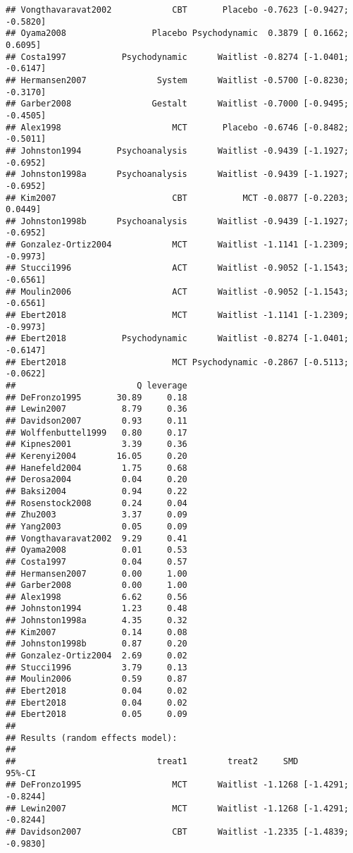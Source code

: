 \documentclass[]{book}
\theoremstyle{definition}
\theoremstyle{definition}
\theoremstyle{definition}
\theoremstyle{remark}
\begin{document}
\begin{verbatim}
## Vongthavaravat2002            CBT       Placebo -0.7623 [-0.9427; -0.5820]
## Oyama2008                 Placebo Psychodynamic  0.3879 [ 0.1662;  0.6095]
## Costa1997           Psychodynamic      Waitlist -0.8274 [-1.0401; -0.6147]
## Hermansen2007              System      Waitlist -0.5700 [-0.8230; -0.3170]
## Garber2008                Gestalt      Waitlist -0.7000 [-0.9495; -0.4505]
## Alex1998                      MCT       Placebo -0.6746 [-0.8482; -0.5011]
## Johnston1994       Psychoanalysis      Waitlist -0.9439 [-1.1927; -0.6952]
## Johnston1998a      Psychoanalysis      Waitlist -0.9439 [-1.1927; -0.6952]
## Kim2007                       CBT           MCT -0.0877 [-0.2203;  0.0449]
## Johnston1998b      Psychoanalysis      Waitlist -0.9439 [-1.1927; -0.6952]
## Gonzalez-Ortiz2004            MCT      Waitlist -1.1141 [-1.2309; -0.9973]
## Stucci1996                    ACT      Waitlist -0.9052 [-1.1543; -0.6561]
## Moulin2006                    ACT      Waitlist -0.9052 [-1.1543; -0.6561]
## Ebert2018                     MCT      Waitlist -1.1141 [-1.2309; -0.9973]
## Ebert2018           Psychodynamic      Waitlist -0.8274 [-1.0401; -0.6147]
## Ebert2018                     MCT Psychodynamic -0.2867 [-0.5113; -0.0622]
##                        Q leverage
## DeFronzo1995       30.89     0.18
## Lewin2007           8.79     0.36
## Davidson2007        0.93     0.11
## Wolffenbuttel1999   0.80     0.17
## Kipnes2001          3.39     0.36
## Kerenyi2004        16.05     0.20
## Hanefeld2004        1.75     0.68
## Derosa2004          0.04     0.20
## Baksi2004           0.94     0.22
## Rosenstock2008      0.24     0.04
## Zhu2003             3.37     0.09
## Yang2003            0.05     0.09
## Vongthavaravat2002  9.29     0.41
## Oyama2008           0.01     0.53
## Costa1997           0.04     0.57
## Hermansen2007       0.00     1.00
## Garber2008          0.00     1.00
## Alex1998            6.62     0.56
## Johnston1994        1.23     0.48
## Johnston1998a       4.35     0.32
## Kim2007             0.14     0.08
## Johnston1998b       0.87     0.20
## Gonzalez-Ortiz2004  2.69     0.02
## Stucci1996          3.79     0.13
## Moulin2006          0.59     0.87
## Ebert2018           0.04     0.02
## Ebert2018           0.04     0.02
## Ebert2018           0.05     0.09
## 
## Results (random effects model):
## 
##                            treat1        treat2     SMD             95%-CI
## DeFronzo1995                  MCT      Waitlist -1.1268 [-1.4291; -0.8244]
## Lewin2007                     MCT      Waitlist -1.1268 [-1.4291; -0.8244]
## Davidson2007                  CBT      Waitlist -1.2335 [-1.4839; -0.9830]

\end{verbatim}
\end{document}
